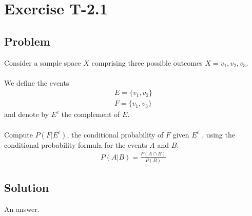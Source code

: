 \section*{Exercise T-2.1}

\subsection*{Problem}
Consider a sample space $X$ comprising three possible outcomes $X = {v_1, v_2, v_3}$.\\ \\
We define the events
\begin{align}
	E = \{v_1,v_2\} \nonumber \\
	F = \{v_1,v_3\}\nonumber 
\end{align}
and denote by $E^c$ the complement of $E$.\\ \\
Compute $P(F|E^c)$, the conditional probability of $F$ given $E^c$ , using the conditional
probability formula for the events $A$ and $B$:\\

\begin{align}
P(A|B)=  \frac{P(A \cap B)}{P(B)} \nonumber 
\end{align}


\subsection*{Solution}
An answer.
